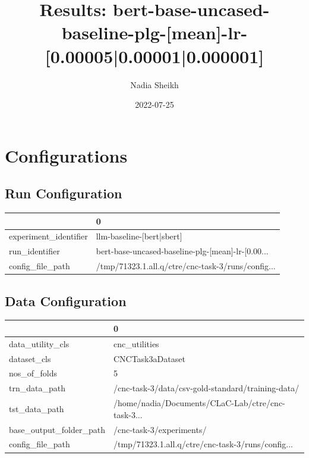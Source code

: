 \documentclass{article}
\title{Results: bert-base-uncased-baseline-plg-[mean]-lr-[0.00005|0.00001|0.000001]}
\author{Nadia Sheikh}
\date{2022-07-25}
\begin{document}
\maketitle
\section{Configurations}
\subsection{Run Configuration}
\begin{tabular}{ll}
\toprule
{} &                                                  0 \\
\midrule
experiment\_identifier &                          llm-baseline-[bert|sbert] \\
run\_identifier        &  bert-base-uncased-baseline-plg-[mean]-lr-[0.00... \\
config\_file\_path      &  /tmp/71323.1.all.q/ctre/cnc-task-3/runs/config... \\
\bottomrule
\end{tabular}

\subsection{Data Configuration}
\begin{tabular}{ll}
\toprule
{} &                                                  0 \\
\midrule
data\_utility\_cls        &                                      cnc\_utilities \\
dataset\_cls             &                                   CNCTask3aDataset \\
nos\_of\_folds            &                                                  5 \\
trn\_data\_path           &  /cnc-task-3/data/csv-gold-standard/training-data/ \\
tst\_data\_path           &  /home/nadia/Documents/CLaC-Lab/ctre/cnc-task-3... \\
base\_output\_folder\_path &                           /cnc-task-3/experiments/ \\
config\_file\_path        &  /tmp/71323.1.all.q/ctre/cnc-task-3/runs/config... \\
\bottomrule
\end{tabular}
\end{document}
